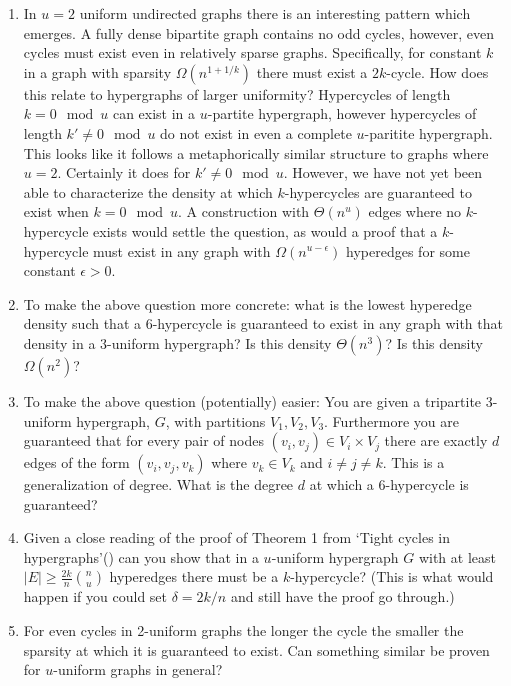 \documentclass[11pt,letterpaper,pdftex]{article}
\begin{document}
\begin{enumerate}
    \item In $u=2$ uniform undirected graphs there is an interesting pattern which emerges. A fully dense bipartite graph contains no odd cycles, however, even cycles must exist even in relatively sparse graphs. Specifically, for constant $k$ in a graph with sparsity $\Omega(n^{1+1/k})$ there must exist a $2k$-cycle. How does this relate to hypergraphs of larger uniformity? Hypercycles of length $k = 0 \mod u$ can exist in a $u$-partite hypergraph, however hypercycles of length $k' \ne 0 \mod u$ do not exist in even a complete $u$-paritite hypergraph. This looks like it follows a metaphorically similar structure to graphs where $u=2$. Certainly it does for $k' \ne 0 \mod u$. However, we have not yet been able to characterize the density at which $k$-hypercycles are guaranteed to exist when $k = 0 \mod u$. A construction with $\Theta(n^u)$ edges where no $k$-hypercycle exists would settle the question, as would  a proof that a $k$-hypercycle must exist in any graph with $\Omega(n^{u-\epsilon})$ hyperedges for some constant $\epsilon >0$.
    \item To make the above question more concrete: what is the lowest hyperedge density such that a $6$-hypercycle is guaranteed to exist in any graph with that density in a $3$-uniform hypergraph? Is this density $\Theta(n^3)$? Is this density $\Omega(n^2)$?
    \item To make the above question (potentially) easier: You are given a tripartite 3-uniform hypergraph, $G$, with partitions $V_1, V_2, V_3$. Furthermore you are guaranteed that for every pair of nodes $(v_i, v_j) \in V_i \times V_j$ there are exactly $d$ edges of the form $(v_i, v_j, v_k)$ where $v_k \in V_k$ and $i\ne j \ne k$. This is a generalization of degree. What is the degree $d$ at which a $6$-hypercycle is guaranteed?
    \item Given a close reading of the proof of Theorem 1 from `Tight cycles in hypergraphs'(\cite{allen2015tight}) can you show that in a $u$-uniform hypergraph $G$ with at least $|E| \geq \frac{2k}{n} \binom{n}{u}$ hyperedges there must be a $k$-hypercycle? (This is what would happen if you could set $\delta = 2k/n$ and still have the proof go through.)
    \item For even cycles in 2-uniform graphs the longer the cycle the smaller the sparsity at which it is guaranteed to exist. Can something similar be proven for $u$-uniform graphs in general? 
\end{enumerate}
\end{document}
